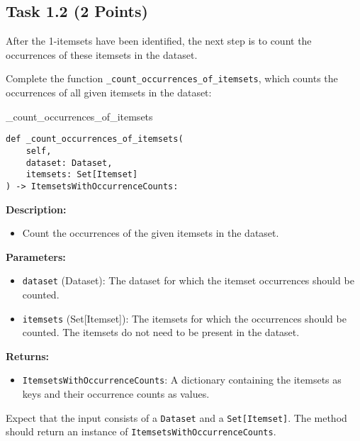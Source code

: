 \documentclass[
english,
smallborders
]{i6prcsht}
\newcommand{\points}[1]{\hfill \color{red}(#1 Points)\color{black}}
\begin{document}
\newpage 

\subsection*{Task 1.2 \points{2}}

After the 1-itemsets have been identified, the next step is to count the occurrences of these itemsets in the dataset.

Complete the function \texttt{\_count\_occurrences\_of\_itemsets}, which counts the occurrences of all given itemsets in the dataset:

\vspace*{0.3cm}

\begin{functionbox}{\_count\_occurrences\_of\_itemsets}
	\begin{lstlisting}[numbers=none]
def _count_occurrences_of_itemsets(
    self, 
    dataset: Dataset, 
    itemsets: Set[Itemset]
) -> ItemsetsWithOccurrenceCounts:
\end{lstlisting}
	
	\textbf{Description:}
	\begin{itemize}[leftmargin=*,topsep=0pt]
		\item Count the occurrences of the given itemsets in the dataset.
	\end{itemize}
	
	\textbf{Parameters:}
	\begin{itemize}[leftmargin=*,topsep=0pt]
		\item \texttt{dataset} (Dataset): The dataset for which the itemset occurrences should be counted.
		\item \texttt{itemsets} (Set[Itemset]): The itemsets for which the occurrences should be counted. The itemsets do not need to be present in the dataset.
	\end{itemize}
	
	\textbf{Returns:}
	\begin{itemize}[leftmargin=*,topsep=0pt]
		\item \texttt{ItemsetsWithOccurrenceCounts}: A dictionary containing the itemsets as keys and their occurrence counts as values.
	\end{itemize}
\end{functionbox}

\vspace*{0.5cm}

Expect that the input consists of a \texttt{Dataset} and a \texttt{Set[Itemset]}. The method should return an instance of \texttt{ItemsetsWithOccurrenceCounts}.
\end{document}

